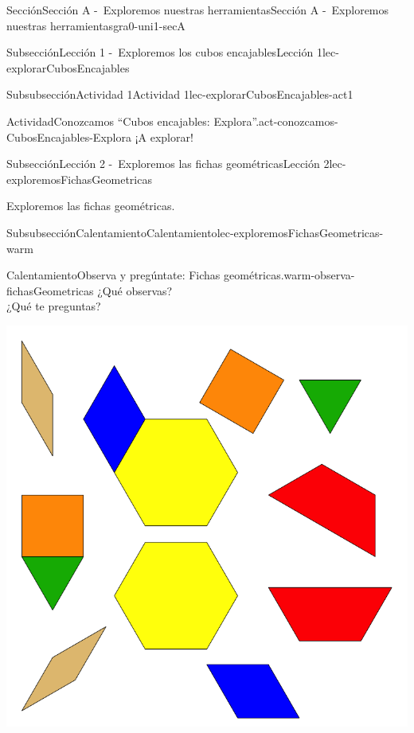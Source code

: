 \documentclass[twoside,10pt,]{article}
\begin{document}
\begin{sectionptx}{Sección}{Sección A -~Exploremos nuestras herramientas}{}{Sección A -~Exploremos nuestras herramientas}{}{}{gra0-uni1-secA}
\begin{subsectionptx}{Subsección}{Lección 1 -~Exploremos los cubos encajables}{}{Lección 1}{}{}{lec-explorarCubosEncajables}
\begin{subsubsectionptx}{Subsubsección}{Actividad 1}{}{Actividad 1}{}{}{lec-explorarCubosEncajables-act1}
\begin{activity}{Actividad}{Conozcamos “Cubos encajables: Explora”.}{act-conozcamos-CubosEncajables-Explora}%
¡A explorar!%
\end{activity}%
\end{subsubsectionptx}
\end{subsectionptx}
%
%
\typeout{************************************************}
\typeout{************************************************}
%
\begin{subsectionptx}{Subsección}{Lección 2 -~Exploremos las fichas geométricas}{}{Lección 2}{}{}{lec-exploremosFichasGeometricas}
\begin{introduction}{}%
Exploremos las fichas geométricas.%
\end{introduction}%
%
%
\typeout{************************************************}
\typeout{************************************************}
%
\begin{subsubsectionptx}{Subsubsección}{Calentamiento}{}{Calentamiento}{}{}{lec-exploremosFichasGeometricas-warm}
\begin{exploration}{Calentamiento}{Observa y pregúntate: Fichas geométricas.}{warm-observa-fichasGeometricas}%
¿Qué observas?\\
 ¿Qué te preguntas?%
\begin{image}{0}{1}{0}{}%
\includegraphics[width=\linewidth]{external/svg-source/tikz-file-148141.pdf}

\end{image}
\end{exploration}
\end{subsubsectionptx}
\end{subsectionptx}
\end{sectionptx}
\end{document}
